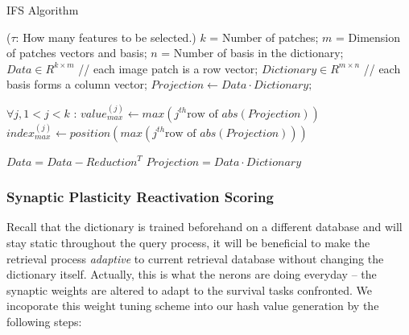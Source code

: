 \documentclass[letterpaper]{article}
\begin{document}
\begin{algorithm}[h]
  \caption{IFS Algorithm}
  \begin{small}
  \begin{algorithmic}[]
    \State ($\tau$: How many features to be selected.)
  	\State $k$ = Number of patches; 
  	\State $m$ = Dimension of patches vectors and basis;
  	\State $n$ = Number of basis in the dictionary;
    \State $Data \in R^{k \times m}$ // each image patch is a row vector;
    \State $Dictionary \in R^{m \times n}$ // each basis forms a column vector;
    \State $Projection \leftarrow Data\cdot Dictionary;$

    	\State $\forall j, 1<j<k$ :
    	\State $value_{max}^{(j)} \leftarrow max(j^{th} \mbox{row of }abs(Projection))$
    	\State $index_{max}^{(j)} \leftarrow position(max(j^{th} \mbox{row of }abs(Projection)))$

         \EndFor
         \State $Data=Data - Reduction^T$
         \State $Projection = Data\cdot Dictionary$
    \EndFor 

  \end{algorithmic}
  \end{small}
\end{algorithm}


\subsubsection{Synaptic Plasticity Reactivation Scoring}
Recall that the dictionary is trained beforehand on a different database and will stay static throughout the query process, it will be beneficial to make the retrieval process \emph{adaptive} to current retrieval database without changing the dictionary itself. Actually, this is what the nerons are doing everyday -- the synaptic weights are altered to adapt to the survival tasks confronted. We incoporate this weight tuning scheme into our hash value generation by the following steps:
\end{document}

